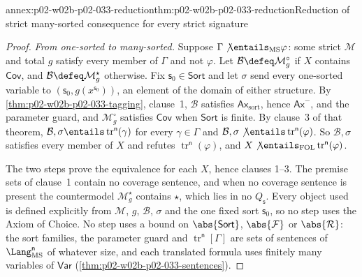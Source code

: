\begin{annexitem}{annex:p02-w02b-p02-033-reduction}{thm:p02-w02b-p02-033-reduction}{Reduction of strict many-sorted consequence for every strict signature}
\begin{proof}
\emph{From one-sorted to many-sorted.}  Suppose
\(\Gamma\not\entails_{\mathrm{MS}}\varphi\): some strict \(\mathcal M\) and
total \(g\) satisfy every member of \(\Gamma\) and not \(\varphi\).  Let
\(\mathcal B\defeq\mathcal M^{\circ}_{g}\) if \(X\) contains \(\mathsf{Cov}\),
and \(\mathcal B\defeq\mathcal M^{\star}_{g}\) otherwise.  Fix
\(\mathsf s_0\in\mathsf{Sort}\) and let \(\sigma\) send every one-sorted
variable to \((\mathsf s_0,g(x^{\mathsf s_0}))\), an element of the domain of
either structure.  By \cref{thm:p02-w02b-p02-033-tagging}, clause~1,
\(\mathcal B\) satisfies \(\mathsf{Ax}_{\mathrm{sort}}\), hence
\(\mathsf{Ax}^{-}\), and the parameter guard, and
\(\mathcal M^{\circ}_{g}\) satisfies \(\mathsf{Cov}\) when \(\mathsf{Sort}\)
is finite.  By clause~3 of that theorem,
\(\mathcal B,\sigma\entails\operatorname{tr}^{\mathsf n}(\gamma)\) for every
\(\gamma\in\Gamma\) and
\(\mathcal B,\sigma\not\entails\operatorname{tr}^{\mathsf n}(\varphi)\).  So
\(\mathcal B,\sigma\) satisfies every member of \(X\) and refutes
\(\operatorname{tr}^{\mathsf n}(\varphi)\), and
\(X\not\entails_{\mathrm{FOL}}\operatorname{tr}^{\mathsf n}(\varphi)\).

The two steps prove the equivalence for each \(X\), hence clauses 1--3.  The
premise sets of clause~1 contain no coverage sentence, and when no coverage
sentence is present the countermodel \(\mathcal M^{\star}_{g}\) contains
\(\star\), which lies in no \(Q_{\mathsf s}\).  Every object used is defined
explicitly from \(\mathcal M\), \(g\), \(\mathcal B\), \(\sigma\) and the one
fixed sort \(\mathsf s_0\), so no step uses the Axiom of Choice.  No step
uses a bound on \(\abs{\mathsf{Sort}}\), \(\abs{\mathcal F}\) or
\(\abs{\mathcal R}\): the sort families, the parameter guard and
\(\operatorname{tr}^{\mathsf n}[\Gamma]\) are sets of sentences of
\(\Lang_{\mathrm{MS}}^{\mathsf n}\) of whatever size, and each translated
formula uses finitely many variables of \(\mathsf{Var}\)
(\cref{thm:p02-w02b-p02-033-sentences}).
\end{proof}
\end{annexitem}

